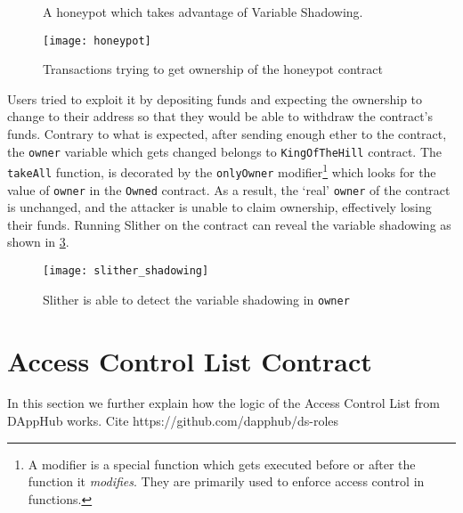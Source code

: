 \begin{figure}[ht!]
    \centering
    
    \caption{A honeypot which takes advantage of Variable Shadowing.}
    \label{fig:owner_honeypot}
\end{figure}

\begin{figure}[ht!]
    \centering
    \texttt{[image: honeypot]}
    \caption{Transactions trying to get ownership of the honeypot contract}
    \label{fig:honeypot_tx}
\end{figure}

Users tried to exploit it by depositing funds and expecting the ownership to change to their address so that they would be able to withdraw the contract's funds. Contrary to what is expected, after sending enough ether to the contract, the \texttt{owner} variable which gets changed belongs to \texttt{KingOfTheHill} contract. The \texttt{takeAll} function, is decorated by the \texttt{onlyOwner} modifier\footnote{A modifier is a special function which gets executed before or after the function it \textit{modifies}. They are primarily used to enforce access control in functions.} which looks for the value of \texttt{owner} in the \texttt{Owned} contract. As a result, the `real' \texttt{owner} of the contract is unchanged, and the attacker is unable to claim ownership, effectively losing their funds. Running Slither on the contract can reveal the variable shadowing as shown in \ref{fig:slither_shadowing}.

\begin{figure}[H]
    \centering
    \texttt{[image: slither\_shadowing]}
    \caption{Slither is able to detect the variable shadowing in \texttt{owner}}
    \label{fig:slither_shadowing}
\end{figure}
\section{Access Control List Contract}

In this section we further explain how the logic of the Access Control List from DAppHub works. Cite  https://github.com/dapphub/ds-roles